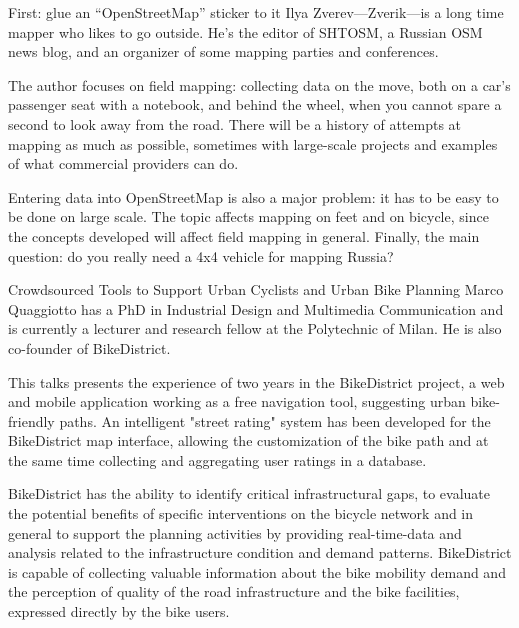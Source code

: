 %
{First: glue an ``OpenStreetMap'' sticker to it}%
{Ilya Zverev---Zverik---is a long time mapper who likes to go outside. He's the editor of SHTOSM, a Russian OSM news blog, and an organizer of some mapping parties and conferences. }%
{The author focuses on field mapping: collecting data on the move, both on a car's passenger seat with a notebook, and behind the wheel, when you cannot spare a second to look away from the road. There will be a history of attempts at mapping as much as possible, sometimes with large-scale projects and examples of what commercial providers can do. 

Entering data into OpenStreetMap is also a major problem: it has to be easy to be done on large scale. The topic affects mapping on feet and on bicycle, since the concepts developed will affect field mapping in general. Finally, the main question: do you really need a 4x4 vehicle for mapping Russia?}

%
{Crowdsourced Tools to Support Urban Cyclists and Urban Bike Planning}%
{Marco Quaggiotto has a PhD in Industrial Design and Multimedia Communication and is currently a lecturer and research fellow at the Polytechnic of Milan. He is also co-founder of BikeDistrict.}
{This talks presents the experience of two years in the BikeDistrict project, a 
web and mobile application working as a free navigation tool, suggesting urban bike-friendly paths. 
An intelligent "street rating" system has been developed for the BikeDistrict map interface, allowing the customization of the bike path and at the same time collecting and aggregating user ratings in a database.
 
BikeDistrict has the ability to identify critical infrastructural gaps, to evaluate the potential benefits of specific interventions on the bicycle network and in general to support the planning activities by providing real-time-data and analysis related to the infrastructure condition and demand patterns. BikeDistrict is capable of collecting valuable information about the bike mobility demand and the perception of quality of the road infrastructure and the bike facilities, expressed directly by the bike users. }

